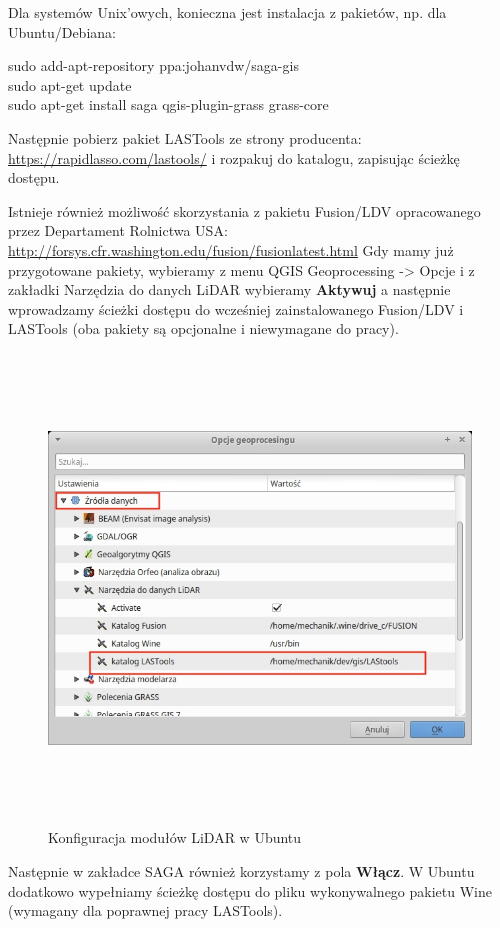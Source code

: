 \documentclass[12pt,a4paper]{book}
\begin{document}
Dla systemów Unix'owych, konieczna jest instalacja z pakietów, np. dla Ubuntu/Debiana:


sudo add-apt-repository ppa:johanvdw/saga-gis 
\\sudo apt-get update
\\sudo apt-get install saga qgis-plugin-grass grass-core


Następnie pobierz pakiet LASTools ze strony producenta: \url{https://rapidlasso.com/lastools/} i rozpakuj do katalogu, zapisując ścieżkę dostępu.

Istnieje również możliwość skorzystania z pakietu Fusion/LDV opracowanego przez Departament Rolnictwa USA: \url{http://forsys.cfr.washington.edu/fusion/fusionlatest.html} Gdy mamy już przygotowane pakiety, wybieramy z menu QGIS Geoprocessing -{\textgreater} Opcje i z zakładki Narzędzia do danych LiDAR wybieramy \textbf{Aktywuj }a następnie wprowadzamy ścieżki dostępu do wcześniej zainstalowanego Fusion/LDV i LASTools (oba pakiety są opcjonalne i niewymagane do pracy).



\begin{center}
\begin{figure}
\includegraphics[width=16.838cm,height=12.457cm]{002-lidar.jpg}
\caption{Konfiguracja modułów LiDAR w Ubuntu}
\end{figure} 
\end{center}
Następnie w zakładce SAGA również korzystamy z pola \textbf{Włącz}. W Ubuntu dodatkowo wypełniamy ścieżkę dostępu do pliku wykonywalnego pakietu Wine (wymagany dla poprawnej pracy LASTools).
\end{document}
